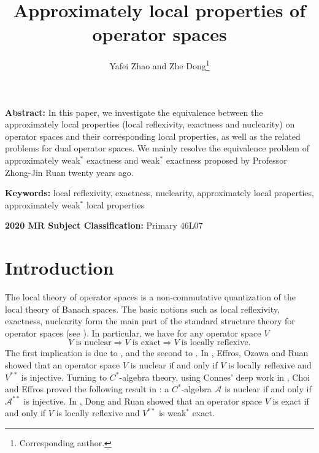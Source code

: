 \documentclass[12pt]{article}
\title{Approximately local properties of operator spaces}
\author{Yafei Zhao and Zhe Dong\thanks{Corresponding author.}}
\date{}
\theoremstyle{definition}
\theoremstyle{remark}
\begin{document}
\maketitle

\begin{center}
\begin{minipage}{11.5cm}
{\bf Abstract:} In this paper, we investigate the equivalence between the approximately local properties (local reflexivity, exactness and nuclearity) on operator spaces and their corresponding local properties, as well as the related problems for dual operator spaces. We mainly resolve the equivalence problem of  approximately weak$^*$ exactness and weak$^*$ exactness proposed by Professor Zhong-Jin Ruan twenty years ago.
\par
{\bf Keywords:} local reflexivity, exactness, nuclearity, approximately local properties, approximately weak$^*$ local properties
\par
{\bf 2020 MR Subject Classification:} Primary 46L07
\end{minipage}
\end{center}


\section{Introduction}

The local theory of operator spaces is a non-commutative quantization of the local theory of Banach spaces. The basic notions such as local reflexivity, exactness, nuclearity form the main part of the standard structure theory for operator spaces (see \cite{CE77b,ER00,EOR,Ki93,Pi92,Pi03,Ru88,Ru89}). In particular, we have for any operator space \(V\)
\[
V\;\mbox{is nuclear}\Rightarrow V\;\mbox{is exact}\Rightarrow V\;\mbox{is locally reflexive}.
\]
The first implication is due to \cite{Pi92}, and the second to \cite{EOR}. In \cite{EOR}, Effros, Ozawa and Ruan showed that an operator space \(V\) is nuclear if and only if \(V\) is locally reflexive and \(V^{**}\) is injective. Turning to \(C^*\)-algebra theory, using Connes' deep work in \cite{Co76}, Choi and Effros proved the following result in \cite{CE76,CE77a}: a \(C^*\)-algebra \(\mathcal{A}\) is nuclear if and only if \(\mathcal{A}^{**}\) is injective. In \cite{DR}, Dong and Ruan showed that an operator space \(V\) is exact if and only if \(V\) is locally reflexive and \(V^{**}\) is weak$^*$ exact.
\end{document}
